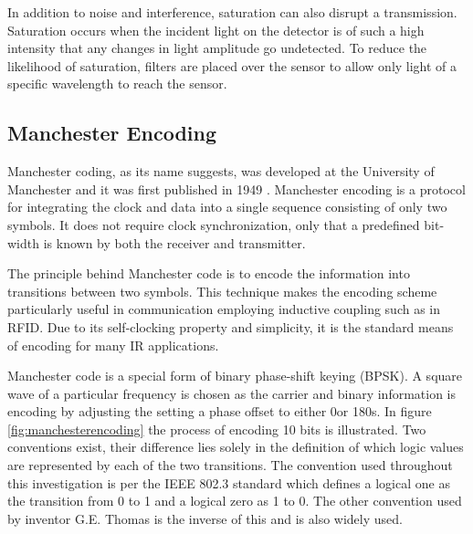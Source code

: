 In addition to noise and interference, saturation can also disrupt a transmission. Saturation occurs when the incident light on the detector is of such a high intensity that any changes in light amplitude go undetected. To reduce the likelihood of saturation, filters are placed over the sensor to allow only light of a specific wavelength to reach the sensor.



\subsection{Manchester Encoding}
\label{sec:manchester_encoding}

Manchester coding, as its name suggests, was developed at the University of Manchester and it was first published in 1949 \cite{Jameel2019}. Manchester encoding is a protocol for integrating the clock and data into a single sequence consisting of only two symbols. It does not require clock synchronization, only that a predefined bit-width is known by both the receiver and transmitter. 

The principle behind Manchester code is to encode the information into transitions between two symbols. This technique makes the encoding scheme particularly useful in communication employing inductive coupling such as in RFID. Due to its self-clocking property and simplicity, it is the standard means of encoding for many IR applications.

Manchester code is a special form of binary phase-shift keying (BPSK). A square wave of a particular frequency is chosen as the carrier and binary information is encoding by adjusting the setting a phase offset to either 0\degree or 180\degree s. In figure \ref{fig:manchesterencoding} the process of encoding 10 bits is illustrated. Two conventions exist, their difference lies solely in the definition of which logic values are represented by each of the two transitions. The convention used throughout this investigation is per the IEEE 802.3 standard which defines a logical one as the transition from 0 to 1 and a logical zero as 1 to 0. The other convention used by inventor G.E. Thomas is the inverse of this and is also widely used.\\

